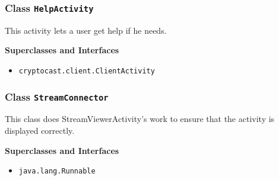 \subsubsection{Class \lstinline|HelpActivity|}
This activity lets a user get help if he needs. \\
\noindent\begin{minipage}[t]{5cm}
\vspace{0.3em}
\hspace*{2em}
\vspace{0.3em}
\end{minipage}



\textbf{\sffamily Superclasses and Interfaces}
\begin{itemize}
\item \lstinline|cryptocast.client.ClientActivity|
\end{itemize}



\subsubsection{Class \lstinline|StreamConnector|}
This class does StreamViewerActivity's work to ensure that the activity is displayed
 correctly. \\
\noindent\begin{minipage}[t]{5cm}
\vspace{0.3em}
\hspace*{2em}
\vspace{0.3em}
\end{minipage}



\textbf{\sffamily Superclasses and Interfaces}
\begin{itemize}
\item \lstinline|java.lang.Runnable|
\end{itemize}



